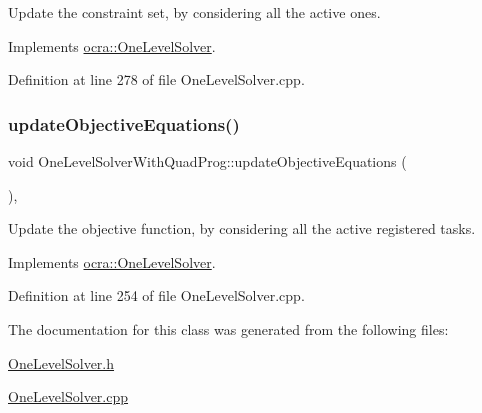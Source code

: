 Update the constraint set, by considering all the active ones. 

Implements \hyperlink{classocra_1_1OneLevelSolver_af592dc713af6cf22e67abcdfba09ca5e}{ocra\+::\+One\+Level\+Solver}.



Definition at line 278 of file One\+Level\+Solver.\+cpp.

\hypertarget{classocra_1_1OneLevelSolverWithQuadProg_a3c36b4620ee75c8f6c104244350087c2}{}\label{classocra_1_1OneLevelSolverWithQuadProg_a3c36b4620ee75c8f6c104244350087c2} 
\subsubsection{\texorpdfstring{update\+Objective\+Equations()}{updateObjectiveEquations()}}
{\footnotesize\ttfamily void One\+Level\+Solver\+With\+Quad\+Prog\+::update\+Objective\+Equations (\begin{DoxyParamCaption}{ }\end{DoxyParamCaption})\hspace{0.3cm}{\ttfamily [protected]}, {\ttfamily [virtual]}}

Update the objective function, by considering all the active registered tasks. 

Implements \hyperlink{classocra_1_1OneLevelSolver_a150b377a35e30ae9c347147c10fddb33}{ocra\+::\+One\+Level\+Solver}.



Definition at line 254 of file One\+Level\+Solver.\+cpp.



The documentation for this class was generated from the following files\+:\begin{DoxyCompactItemize}
\item 
\hyperlink{OneLevelSolver_8h}{One\+Level\+Solver.\+h}\item 
\hyperlink{OneLevelSolver_8cpp}{One\+Level\+Solver.\+cpp}\end{DoxyCompactItemize}
